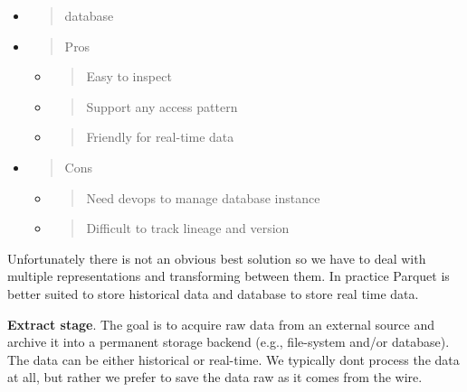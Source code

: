 \documentclass[11pt, reqno]{amsart}
\begin{document}
\begin{itemize}
\item
  \begin{quote}
  database
  \end{quote}
\end{itemize}

\begin{itemize}
\item
  \begin{quote}
  Pros
  \end{quote}

  \begin{itemize}
  \item
    \begin{quote}
    Easy to inspect
    \end{quote}
  \item
    \begin{quote}
    Support any access pattern
    \end{quote}
  \item
    \begin{quote}
    Friendly for real-time data
    \end{quote}
  \end{itemize}
\item
  \begin{quote}
  Cons
  \end{quote}

  \begin{itemize}
  \item
    \begin{quote}
    Need devops to manage database instance
    \end{quote}
  \item
    \begin{quote}
    Difficult to track lineage and version
    \end{quote}
  \end{itemize}
\end{itemize}

Unfortunately there is not an obvious best solution so we have to deal
with multiple representations and transforming between them. In practice
Parquet is better suited to store historical data and database to store
real time data.

\textbf{Extract stage}. The goal is to acquire raw data from an external
source and archive it into a permanent storage backend (e.g.,
file-system and/or database). The data can be either historical or
real-time. We typically don\textquotesingle t process the data at all,
but rather we prefer to save the data raw as it comes from the wire.
\end{document}
